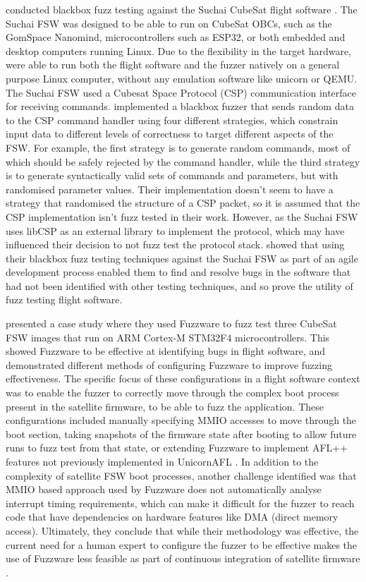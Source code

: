\documentclass[../report.tex]{subfiles}
\begin{document}
\citet{Gutierrez_2021} conducted blackbox fuzz testing against the Suchai
CubeSat flight software \citep{Suchai_FSW}. The Suchai FSW was designed to be
able to run on CubeSat OBCs, such as the GomSpace Nanomind, microcontrollers
such as ESP32, or both embedded and desktop computers running Linux. Due to
the flexibility in the target hardware, \citet{Gutierrez_2021} were able to
run both the flight software and the fuzzer natively on a general purpose Linux
computer, without any emulation software like unicorn or QEMU. The Suchai FSW
used a Cubesat Space Protocol (CSP) communication interface for receiving
commands. \citet{Gutierrez_2021} implemented a blackbox fuzzer that sends
random data to the CSP command handler using four different strategies, which
constrain input data to different levels of correctness to target different
aspects of the FSW. For example, the first strategy is to generate random
commands, most of which should be safely rejected by the command handler, while
the third strategy is to generate syntactically valid sets of commands and
parameters, but with randomised parameter values. Their implementation doesn't
seem to have a strategy that randomised the structure of a CSP packet, so it is
assumed that the CSP implementation isn't fuzz tested in their work. However, as
the Suchai FSW uses libCSP as an external library to implement the protocol,
which may have influenced their decision to not fuzz test the protocol stack.
\citet{Gutierrez_2021} showed that using their blackbox fuzz testing
techniques against the Suchai FSW as part of an agile development process
enabled them to find and resolve bugs in the software that had not been
identified with other testing techniques, and so prove the utility of fuzz
testing flight software.

\citet{Scharnowski_2023} presented a case study where they used Fuzzware
\citep{Fuzzware_2022} to fuzz test three CubeSat FSW images that run on ARM
Cortex-M STM32F4 microcontrollers. This showed Fuzzware to be effective at
identifying bugs in flight software, and demonstrated different methods of
configuring Fuzzware to improve fuzzing effectiveness. The specific focus of
these configurations in a flight software context was to enable the fuzzer to
correctly move through the complex boot process present in the satellite
firmware, to be able to fuzz the application. These configurations included
manually specifying MMIO accesses to move through the boot section,
taking snapshots of the firmware state after booting to allow future runs to
fuzz test from that state, or extending Fuzzware to implement AFL++ features
not previously implemented in UnicornAFL \citep{Scharnowski_2023}. In addition
to the complexity of satellite FSW boot processes, another challenge identified
was that MMIO based approach used by Fuzzware does not automatically analyse
interrupt timing requirements, which can make it difficult for the fuzzer to
reach code that have dependencies on hardware features like DMA (direct memory
access). Ultimately, they conclude that while their methodology was effective,
the current need for a human expert to configure the fuzzer to be effective
makes the use of Fuzzware less feasible as part of continuous integration of
satellite firmware \citep{Scharnowski_2023}.
\end{document}
